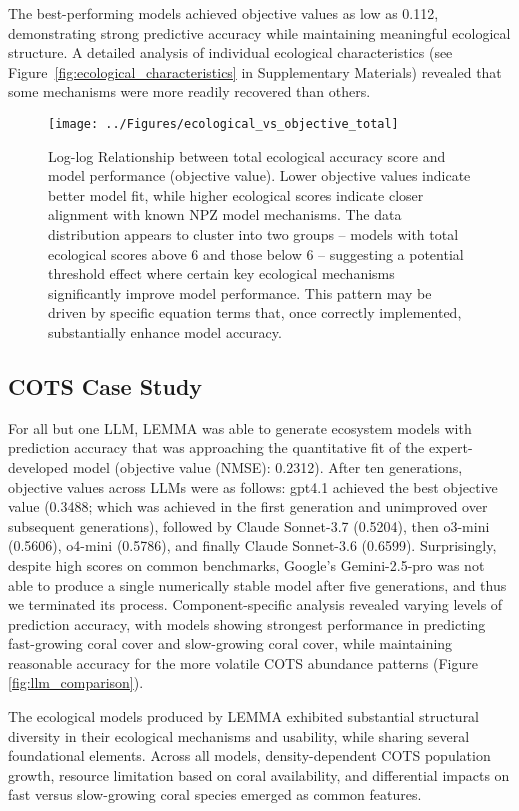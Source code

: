 The best-performing models achieved objective values as low as 0.112, demonstrating strong predictive accuracy while maintaining meaningful ecological structure. A detailed analysis of individual ecological characteristics (see Figure~\ref{fig:ecological_characteristics} in Supplementary Materials) revealed that some mechanisms were more readily recovered than others.

\begin{figure}[H]
\centering
\texttt{[image: ../Figures/ecological\_vs\_objective\_total]}
\caption{Log-log Relationship between total ecological accuracy score and model performance (objective value). Lower objective values indicate better model fit, while higher ecological scores indicate closer alignment with known NPZ model mechanisms. The data distribution appears to cluster into two groups -- models with total ecological scores above 6 and those below 6 -- suggesting a potential threshold effect where certain key ecological mechanisms significantly improve model performance. This pattern may be driven by specific equation terms that, once correctly implemented, substantially enhance model accuracy.}
\label{fig:ecological_total}
\end{figure}

\subsection{COTS Case Study}
\label{sec:cots_data}
For all but one LLM, LEMMA was able to generate ecosystem models with prediction accuracy that was approaching the quantitative fit of the expert-developed model (objective value (NMSE): 0.2312). After ten generations, objective values across LLMs were as follows: gpt4.1 achieved the best objective value (0.3488; which was achieved in the first generation and unimproved over subsequent generations), followed by Claude Sonnet-3.7 (0.5204), then o3-mini (0.5606), o4-mini (0.5786), and finally Claude Sonnet-3.6 (0.6599). Surprisingly, despite high scores on common benchmarks, Google's Gemini-2.5-pro was not able to produce a single numerically stable model after five generations, and thus we terminated its process. Component-specific analysis revealed varying levels of prediction accuracy, with models showing strongest performance in predicting fast-growing coral cover and slow-growing coral cover, while maintaining reasonable accuracy for the more volatile COTS abundance patterns (Figure \ref{fig:llm_comparison}).

The ecological models produced by LEMMA exhibited substantial structural diversity in their ecological mechanisms and usability, while sharing several foundational elements. Across all models, density-dependent COTS population growth, resource limitation based on coral availability, and differential impacts on fast versus slow-growing coral species emerged as common features.

